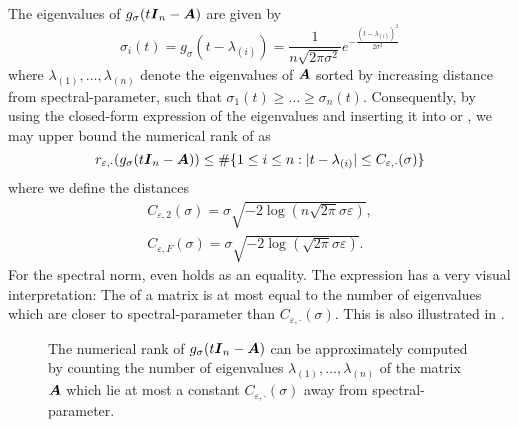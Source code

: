 The eigenvalues of $g_{\sigma}(t\boldsymbol{I}_n - \boldsymbol{A})$ are given by
\begin{equation}
    \sigma_i(t) = g_{\sigma}(t - \lambda_{(i)}) = \frac{1}{n \sqrt{2 \pi \sigma^2}} e^{-\frac{(t - \lambda_{(i)})^2}{2 \sigma^2}}
    \label{equ:3-nystrom-kernel-function-eigenvalues}
\end{equation}
where $\lambda_{(1)}, \dots, \lambda_{(n)}$ denote the
eigenvalues of $\boldsymbol{A}$ sorted by increasing
distance from \gls{spectral-parameter}, such that $\sigma_1(t) \geq \dots \geq \sigma_n(t)$.
Consequently, by using the closed-form expression of the eigenvalues 
and inserting it into  or
,
we may upper bound the numerical rank of  as
\begin{equation}
    r_{\varepsilon, \cdot}(g_{\sigma}(t\boldsymbol{I}_n - \boldsymbol{A})) \leq \#\{1\leq i\leq n: |t - \lambda_{(i)}| \leq C_{\varepsilon, \cdot}(\sigma)\}
    \label{equ:3-nystrom-kernel-numerical-rank}
\end{equation}
where we define the distances
\begin{align}
    C_{\varepsilon, 2}(\sigma) = \sigma \sqrt{-2 \log(n \sqrt{2 \pi} \sigma \varepsilon)}, \label{equ:3-nystrom-kernel-numerical-rank-spectral-constant} \\
    C_{\varepsilon, F}(\sigma) = \sigma \sqrt{-2 \log(\sqrt{2 \pi} \sigma \varepsilon)}. \label{equ:3-nystrom-kernel-numerical-rank-frobenius-constant} 
\end{align}
For the spectral norm,  even holds
as an equality.
The expression  has a very
visual interpretation: The  of a matrix is at most
equal to the number of eigenvalues which are closer to \gls{spectral-parameter}
than $C_{\varepsilon, \cdot}(\sigma)$.
This is also illustrated in .\\
\begin{figure}[ht]
    \centering
    
    \caption{The numerical rank of $g_{\sigma}(t\boldsymbol{I}_n - \boldsymbol{A})$ can be
        approximately computed by counting the number of eigenvalues
        $\lambda_{(1)}, \dots, \lambda_{(n)}$ of the matrix $\boldsymbol{A}$ which lie at most
        a constant $C_{\varepsilon, \cdot}(\sigma)$ away from \gls{spectral-parameter}.}
    \label{fig:3-nystrom-numerical-rank-constant}
\end{figure}

